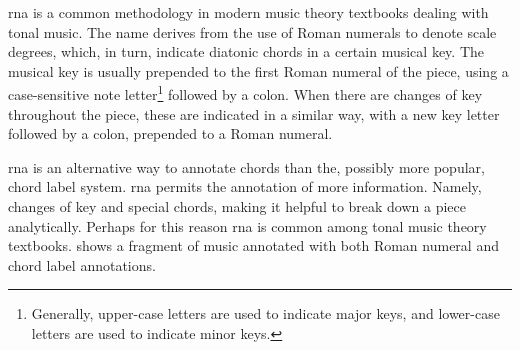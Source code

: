 

\gls{rna} is a common methodology in modern music theory
textbooks dealing with tonal music. The name derives from
the use of Roman numerals to denote scale degrees, which, in
turn, indicate diatonic chords in a certain musical key. The
musical key is usually prepended to the first Roman numeral
of the piece, using a case-sensitive note
letter\footnote{Generally, upper-case letters are used to
indicate major keys, and lower-case letters are used to
indicate minor keys.} followed by a colon. When there are
changes of key throughout the piece, these are indicated in
a similar way, with a new key letter followed by a colon,
prepended to a Roman numeral.

\gls{rna} is an alternative way to annotate chords than the,
possibly more popular, chord label system. \gls{rna} permits
the annotation of more information. Namely, changes of key
and special chords, making it helpful to break down a piece
analytically. Perhaps for this reason \gls{rna} is common
among tonal music theory textbooks.  shows a
fragment of music annotated with both Roman numeral and
chord label annotations.


